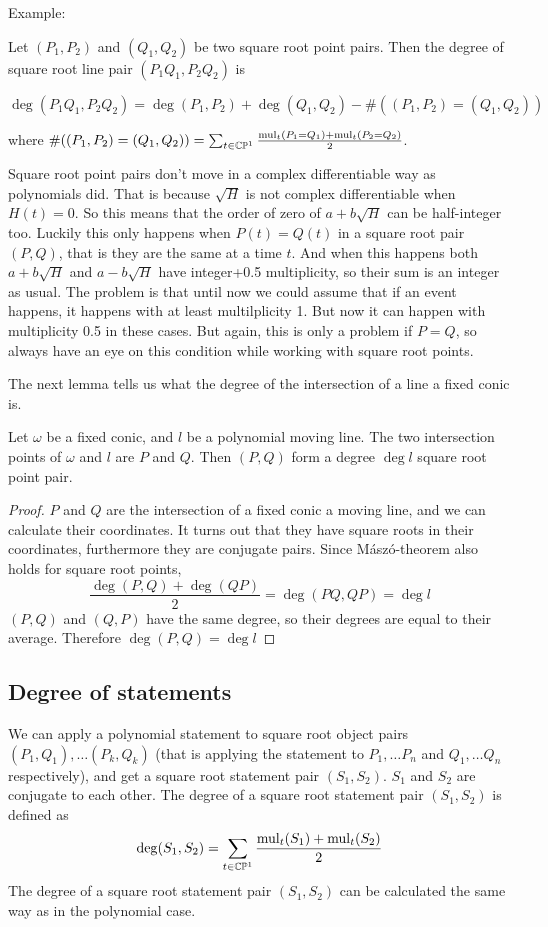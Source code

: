 \documentclass[a4paper]{article}
\begin{document}
Example:
\begin{theorem}
    Let $(P_1,P_2)$ and $(Q_1,Q_2)$ be two square root point pairs. Then the degree of square root line pair $(P_1Q_1, P_2Q_2)$ is

$$\deg (P_1Q_1, P_2Q_2)= \deg (P_1,P_2) + \deg (Q_1,Q_2) - \# ((P_1,P_2)=(Q_1,Q_2))$$

where $\# ((P_1,P_2)=(Q_1,Q_2))=\sum_{t\in \mathbb{C}\mathbb{P}^1} \frac{\operatorname{mul}_t(P_1=Q_1)+\operatorname{mul}_t(P_2=Q_2)}{2}$.
\end{theorem}
\begin{remark}
    Square root point pairs don't move in a complex differentiable way as polynomials did. That is because $\sqrt{H}$ is not complex differentiable when $H(t)=0$. So this means that the order of zero of $a+b\sqrt{H}$ can be half-integer too. Luckily this only happens when $P(t)=Q(t)$ in a square root pair $(P,Q)$, that is they are the same at a time $t$. And when this happens both $a+b\sqrt{H}$ and $a-b\sqrt{H}$ have integer+0.5 multiplicity, so their sum is an integer as usual. The problem is that until now we could assume that if an event happens, it happens with at least multilplicity 1. But now it can happen with multiplicity 0.5 in these cases. But again, this is only a problem if $P=Q$, so always have an eye on this condition while working with square root points.
\end{remark}
The next lemma tells us what the degree of the intersection of a line a fixed conic is.
\begin{lemma}
    Let $\omega$ be a fixed conic, and $l$ be a polynomial moving line. The two intersection points of $\omega$ and $l$ are $P$ and $Q$. Then $(P,Q)$ form a degree $\deg l$ square root point pair.
\end{lemma}
\begin{proof}
    $P$ and $Q$ are the intersection of a fixed conic a moving line, and we can calculate their coordinates. It turns out that they have square roots in their coordinates, furthermore they are conjugate pairs. Since Mászó-theorem also holds for square root points,
    $$\frac{\deg(P,Q)+\deg(QP)}{2}=\deg (PQ,QP)=\deg l$$
    $(P,Q)$ and $(Q,P)$ have the same degree, so their degrees are equal to their average. Therefore $\deg (P,Q)=\deg l$ 
\end{proof}

\subsection{Degree of statements}
We can apply a polynomial statement to square root object pairs $(P_1,Q_1), \ldots (P_k,Q_k)$ (that is applying the statement to $P_1,\ldots P_n$ and $Q_1,\ldots Q_n$ respectively), and get a square root statement pair $(S_1,S_2)$. $S_1$ and $S_2$ are conjugate to each other.
The degree of a square root statement pair $(S_1,S_2)$ is defined as
$$\deg(S_1,S_2)=\sum_{t\in \mathbb{C}\mathbb{P}^1} \frac{\operatorname{mul}_t(S_1)+\operatorname{mul}_t(S_2)}{2}$$
The degree of a square root statement pair $(S_1,S_2)$ can be calculated the same way as in the polynomial case.
\end{document}
